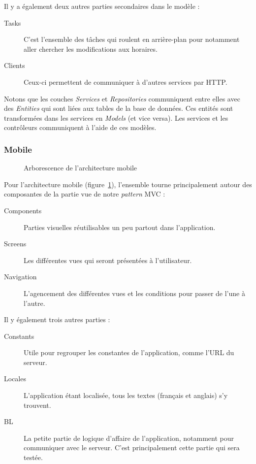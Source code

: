         \noindent Il y a également deux autres parties secondaires dans le modèle :
        \begin{description}
            \item[Tasks] C'est l'ensemble des tâches qui roulent en arrière-plan pour notamment aller chercher les modifications aux horaires.
            \item[Clients] Ceux-ci permettent de communiquer à d'autres services par HTTP.
        \end{description}

        Notons que les couches \emph{Services} et \emph{Repositories} communiquent entre elles avec des \emph{Entities} qui sont liées aux tables de la base de données. Ces entités sont transformées dans les services en \emph{Models} (et vice versa). Les services et les contrôleurs communiquent à l'aide de ces modèles.
        
        \subsubsection{Mobile}
        \begin{figure}[p]
            
            \caption{Arborescence de l'architecture mobile}
            \label{fig.architectureMobile}
        \end{figure}        
        
        Pour l'architecture mobile (figure~\ref{fig.architectureMobile}), l'ensemble tourne principalement autour des composantes de la partie vue de notre \emph{pattern} MVC :
        \begin{description}
            \item[Components] Parties visuelles réutilisables un peu partout dans l'application.
            \item[Screens] Les différentes vues qui seront présentées à l'utilisateur.
            \item[Navigation] L'agencement des différentes vues et les conditions pour passer de l'une à l'autre.
        \end{description}

        \noindent Il y également trois autres parties :
        \begin{description}
            \item[Constants] Utile pour regrouper les constantes de l'application, comme l'URL du serveur.
            \item[Locales] L'application étant localisée, tous les textes (français et anglais) s'y trouvent.
            \item[BL] La petite partie de logique d'affaire de l'application, notamment pour communiquer avec le serveur. C'est principalement cette partie qui sera testée.
        \end{description}
    
